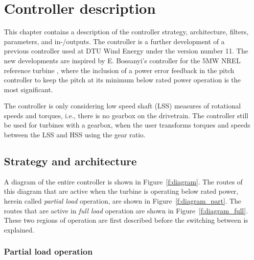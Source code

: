 \chapter{Controller description} \label{cha:description}

This chapter contains a description of the controller strategy, architecture, filters, parameters, and in-/outputs. The controller is a further development of a previous controller used at DTU Wind Energy under the version number 11. The new developments are inspired by E. Bossanyi's controller for the 5MW NREL reference turbine \cite{Bossanyi09}, where the inclusion of a power error feedback in the pitch controller to keep the pitch at its minimum below rated power operation is the most significant.

The controller is only considering low speed shaft (LSS) measures of rotational speeds and torques, i.e., there is no gearbox on the drivetrain. The controller still be used for turbines with a gearbox, when the user transforms torques and speeds between the LSS and HSS using the gear ratio.

\section{Strategy and architecture}

A diagram of the entire controller is shown in Figure~\ref{f:diagram}. The routes of this diagram that are active when the turbine is operating below rated power, herein called \emph{partial load} operation, are shown in Figure~\ref{f:diagram_part}. The routes that are active in \emph{full load} operation are shown in Figure~\ref{f:diagram_full}. These two regions of operation are first described before the switching between is explained.

\subsection{Partial load operation}

